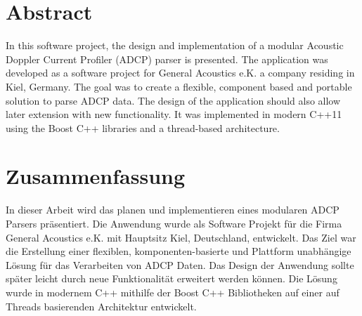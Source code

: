 \chapter*{Abstract}
In this software project, the design and implementation of a modular Acoustic Doppler Current Profiler (ADCP) parser is presented. The application was developed as a software project for General Acoustics e.K. a company residing in Kiel, Germany. The goal was to create a flexible, component based and portable solution to parse ADCP data. The design of the application should also allow later extension with new functionality. It was implemented in modern C++11 using the Boost C++ libraries and a thread-based architecture.
\chapter*{Zusammenfassung}
In dieser Arbeit wird das planen und implementieren eines modularen ADCP Parsers präsentiert. Die Anwendung wurde als Software Projekt für die Firma General Acoustics e.K. mit Hauptsitz Kiel, Deutschland, entwickelt. Das Ziel war die Erstellung einer flexiblen, komponenten-basierte und Plattform unabhängige Lösung für das Verarbeiten von ADCP Daten. Das Design der Anwendung sollte später leicht durch neue Funktionalität erweitert werden können. Die Lösung wurde in modernem C++ mithilfe der Boost C++ Bibliotheken auf einer auf Threads basierenden Architektur entwickelt.


